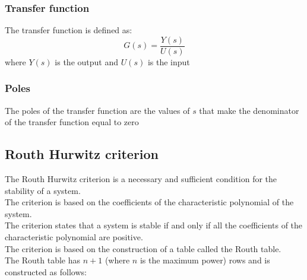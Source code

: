 \documentclass[a4paper,12pt]{article}
\begin{document}
\subsubsection{Transfer function}
The transfer function is defined as:
\begin{equation}
    G(s) = \frac{Y(s)}{U(s)}
\end{equation}
where $Y(s)$ is the output and $U(s)$ is the input
\subsubsection{Poles}
The poles of the transfer function are the values of $s$ 
that make the denominator of the transfer function equal to zero
\
\subsection{Routh Hurwitz criterion}
The Routh Hurwitz criterion is a necessary and sufficient
 condition for the stability of a system.\\
    The criterion is based on the coefficients of the characteristic
        polynomial of the system.\\
        The criterion states that a system is stable if and only if all the 
        coefficients of the characteristic polynomial are positive.\\
        The criterion is based on the construction of a table called the 
        Routh table.\\
        The Routh table has $n+1$ (where $n$ is the maximum power) 
        rows and is constructed as follows:
\end{document}
